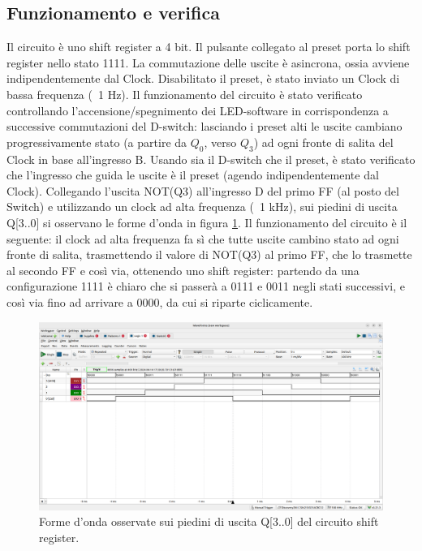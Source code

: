 \documentclass[10pt,a4paper]{article}
\begin{document}
\subsection{Funzionamento e verifica}
Il circuito è uno shift register a 4 bit. Il pulsante collegato al preset porta lo shift register nello stato 1111. La commutazione delle uscite è asincrona, ossia avviene indipendentemente dal Clock.
Disabilitato il preset, è stato inviato un Clock di bassa frequenza (~1 Hz). Il funzionamento del circuito è stato verificato controllando l’accensione/spegnimento dei LED-software in corrispondenza a successive commutazioni del D-switch: lasciando i preset alti le uscite cambiano progressivamente stato (a partire da $Q_0$, verso $Q_3$) ad ogni fronte di salita del Clock in base all'ingresso B. 
Usando sia il D-switch che il preset, è stato verificato che l'ingresso che guida le uscite è il preset (agendo indipendentemente dal Clock).
Collegando l’uscita NOT(Q3) all’ingresso D del primo FF (al posto del Switch) e utilizzando un clock ad alta frequenza (~1 kHz), sui piedini di uscita Q[3..0] si osservano le forme d'onda in figura \ref{fig2}. Il funzionamento del circuito è il seguente: il clock ad alta frequenza fa sì che tutte uscite cambino stato ad ogni fronte di salita, trasmettendo il valore di NOT(Q3) al primo FF, che lo trasmette al secondo FF e così via, ottenendo uno shift register: partendo da una configurazione 1111 è chiaro che si passerà a 0111 e 0011 negli stati successivi, e così via fino ad arrivare a 0000, da cui si riparte ciclicamente.
\begin{figure}[htp]
\begin{center}
\includegraphics[scale=0.25]{fig2.png}
\caption{Forme d'onda osservate sui piedini di uscita Q[3..0] del circuito shift register.}
\label{fig2}
\end{center}
\end{figure}
\end{document}
